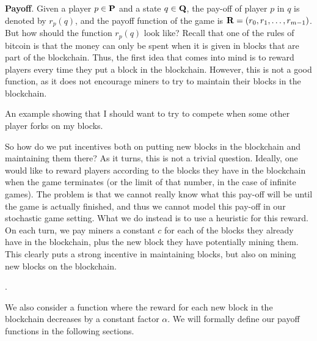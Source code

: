 \medskip
\noindent
\textbf{Payoff}.
Given a player $p \in \mathbf{P}$ and a state $q \in \mathbf{Q}$, the pay-off of player $p$ in $q$ is denoted by $r_p(q)$, and the payoff function of the game is $\mathbf{R} = (r_0, r_1, \ldots, r_{m-1})$. %
But how should the function $r_p(q)$ look like? Recall that one of the rules of bitcoin is that the money can only 
be spent when it is given in blocks that are part of the blockchain. Thus, the first idea that comes into mind is to 
reward players every time they put a block in the blockchain. However, this is not a good function, as it does not encourage miners to try to maintain their blocks in the blockchain. 

\begin{myex} 
An example showing that I should want to try to compete when some other player forks on my blocks. 
\end{myex} 

So how do we put incentives both on putting new blocks in the blockchain and maintaining them there? As it turns, this is not a trivial question. Ideally, one would like to reward players according to the blocks they have in the blockchain when the game terminates (or the limit of that number, in the case of infinite games). The problem is that we cannot really know what this pay-off will be until the game is actually finished, and thus we cannot model this pay-off in our stochastic game setting. 
What we do instead is to use a heuristic for this reward. On each turn, we pay miners a constant $c$ for each of the blocks they already have in the blockchain, plus the new block they have potentially mining them. This clearly puts a strong incentive in maintaining blocks, but also on mining new blocks on the blockchain. 

.

We also consider a function where the reward for each new block in the blockchain decreases by a constant factor $\alpha$. We will formally define our payoff functions in the following sections. 


